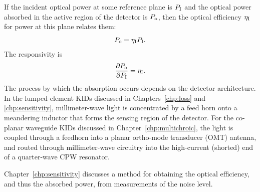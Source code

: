 If the incident optical power at some reference plane is $P_{\mathrm{I}}$ and the optical power absorbed in the active region of the detector is $P_{\mathrm{o}}$, then the optical efficiency $\eta_{\mathrm{I}}$ for power at this plane relates them:
\begin{equation}
\label{eqn:photodetection.response}
P_{\mathrm{o}} = \eta_{\mathrm{I}} P_{\mathrm{I}}.
\end{equation}
The responsivity is
\begin{equation}
\label{eqn:photodetection.responsivity}
\pdv{P_{\mathrm{o}}}{P_{\mathrm{I}}}
  =
  \eta_{\mathrm{I}}.
\end{equation}
The process by which the absorption occurs depends on the detector architecture.
In the lumped-element KIDs discussed in Chapters~\ref{chp:loss} and \ref{chp:sensitivity}, millimeter-wave light is concentrated by a feed horn onto a meandering inductor that forms the sensing region of the detector.
For the co-planar waveguide KIDs discussed in Chapter~\ref{chp:multichroic}, the light is coupled through a feedhorn into a planar ortho-mode transducer (OMT) antenna, and routed through millimeter-wave circuitry into the high-current (shorted) end of a quarter-wave CPW resonator.

Chapter~\ref{chp:sensitivity} discusses a method for obtaining the optical efficiency, and thus the absorbed power, from measurements of the noise level.


